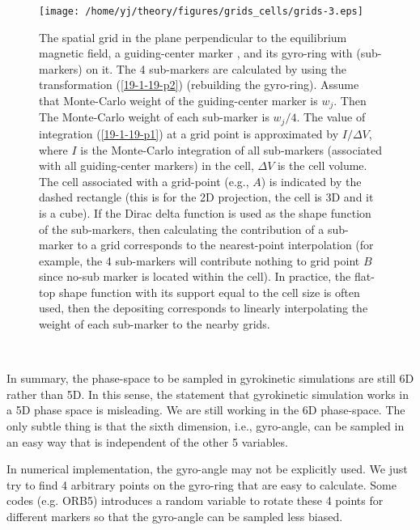 \documentclass{llncs}
\newcommand{\tmcolor}[2]{{\color{#1}{#2}}}
\begin{document}
\begin{figure}[h]
  \texttt{[image: /home/yj/theory/figures/grids\_cells/grids-3.eps]}
  \caption{\label{19-1-19-p4}The spatial grid in the plane perpendicular to
  the equilibrium magnetic field, a guiding-center marker \tmcolor{red}{$C$},
  and its gyro-ring with \tmcolor{blue}{4 sampling points} (sub-markers) on
  it. The 4 sub-markers are calculated by using the transformation
  (\ref{19-1-19-p2}) (rebuilding the gyro-ring). Assume that Monte-Carlo
  weight of the guiding-center marker \tmcolor{red}{$C$} is $w_j$. Then The
  Monte-Carlo weight of each sub-marker is $w_j / 4$. The value of integration
  (\ref{19-1-19-p1}) at a grid point is approximated by $I / \Delta V$, where
  $I$ is the Monte-Carlo integration of all sub-markers (associated with all
  guiding-center markers) in the cell, $\Delta V$ is the cell volume. The cell
  associated with a grid-point (e.g., $A$) is indicated by the dashed
  rectangle (this is for the 2D projection, the cell is 3D and it is a cube).
  If the Dirac delta function is used as the shape function of the
  sub-markers, then calculating the contribution of a sub-marker to a grid
  corresponds to the nearest-point interpolation (for example, the 4
  sub-markers will contribute nothing to grid point $B$ since no-sub marker is
  located within the cell). In practice, the flat-top shape function with its
  support equal to the cell size is often used, then the depositing
  corresponds to linearly interpolating the weight of each sub-marker to the
  nearby grids.}
\end{figure}

\

In summary, the phase-space to be sampled in gyrokinetic simulations are
still 6D rather than 5D. In this sense, the statement that gyrokinetic
simulation works in a 5D phase space is misleading. We are still working in
the 6D phase-space. The only subtle thing is that the sixth dimension, i.e.,
gyro-angle, can be sampled in an easy way that is independent of the other 5
variables.

In numerical implementation, the gyro-angle may not be explicitly used. We
just try to find 4 arbitrary points on the gyro-ring that are easy to
calculate. Some codes (e.g. ORB5) introduces a random variable to rotate these
4 points for different markers so that the gyro-angle can be sampled less
biased.
\end{document}
